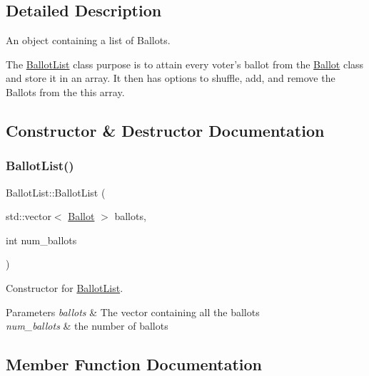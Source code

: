 \subsection{Detailed Description}
An object containing a list of Ballots. 

The \mbox{\hyperlink{class_ballot_list}{Ballot\+List}} class purpose is to attain every voter’s ballot from the \mbox{\hyperlink{class_ballot}{Ballot}} class and store it in an array. It then has options to shuffle, add, and remove the Ballots from the this array. 

\subsection{Constructor \& Destructor Documentation}
\mbox{\label{class_ballot_list_a0a28d688e8a0cd744f6d75080b4b0c3c}} 
\subsubsection{\texorpdfstring{Ballot\+List()}{BallotList()}}
{\footnotesize\ttfamily Ballot\+List\+::\+Ballot\+List (\begin{DoxyParamCaption}\item[{std\+::vector$<$ \mbox{\hyperlink{class_ballot}{Ballot}} $>$}]{ballots,  }\item[{int}]{num\+\_\+ballots }\end{DoxyParamCaption})}



Constructor for \mbox{\hyperlink{class_ballot_list}{Ballot\+List}}. 


\begin{DoxyParams}{Parameters}
{\em ballots} & The vector containing all the ballots \\
\hline
{\em num\+\_\+ballots} & the number of ballots \\
\hline
\end{DoxyParams}


\subsection{Member Function Documentation}
\mbox{\label{class_ballot_list_a19237ad76f1a257ef200cec65a52471a}} 
